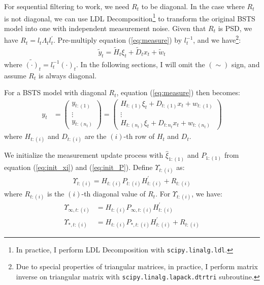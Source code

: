 \documentclass[10pt, titlepage]{article}
\numberwithin{equation}{section}
\begin{document}
For sequential filtering to work, we need $R_t$ to be diagonal. In the case where $R_t$ is not diagonal, we can use LDL Decomposition\footnote{In practice, I perform LDL Decomposition with \texttt{scipy.linalg.ldl}.} to transform the original BSTS model into one with independent measurement noise. Given that $R_t$ is PSD, we have $R_t = l_t\Lambda_tl_t^{'}$. Pre-multiply equation (\ref{eq:measure}) by $l_t^{-1}$, and we have\footnote{Due to special properties of triangular matrices, in practice, I perform matrix inverse on triangular matrix with \texttt{scipy.linalg.lapack.dtrtri} subroutine.}:
\begin{align}
    \tilde{y}_t = \tilde{H}_t\xi_{t} + \tilde{D}_{t}x_t + \tilde{w}_t \label{eq:ldl}
\end{align}
where $\tilde{(\cdot)}_t = l_t^{-1}(\cdot)_t$. In the following sections, I will omit the $(\sim)$ sign, and assume $R_t$ is always diagonal.

For a BSTS model with diagonal $R_t$, equation (\ref{eq:measure}) then becomes:
\begin{align*}
    y_t &= 
    \begin{pmatrix}
        y_{t:(1)} \\
        \vdots \\ 
        y_{t:(n_t)}
    \end{pmatrix} 
    = \begin{pmatrix}
        H_{t:(1)}\xi_t + D_{t:(1)}x_t + w_{t:(1)} \\
        \vdots \\
        H_{t:(n_t)}\xi_t + D_{t:n_t}x_t + w_{t:(n_t)}
    \end{pmatrix}
\end{align*}
where $H_{t:(i)}$ and $D_{t:(i)}$ are the $(i)$-th row of $H_t$ and $D_t$. 

We initialize the measurement update process with $\hat{\xi}_{1:(1)}$ and $P_{1:(1)}$ from equation (\ref{eq:init_xi}) and (\ref{eq:init_P}). Define $\Upsilon_{t:(i)}$ as:
\begin{align*}
    \Upsilon_{t:(i)} = H_{t:(i)}P_{t:(i)}H_{t:(i)}^{'} + R_{t:(i)}
\end{align*}
where $R_{t:(i)}$ is the $(i)$-th diagonal value of $R_{t}$. For $\Upsilon_{t:(i)}$, we have:
\begin{align*}
    \Upsilon_{\infty, t:(i)} &= H_{t:(i)}P_{\infty, t:(i)}H_{t:(i)}^{'} \\
    \Upsilon_{*,t:(i)} &= H_{t:(i)}P_{*,t:(i)}H_{t:(i)}^{'} + R_{t:(i)}
\end{align*}
\end{document}
